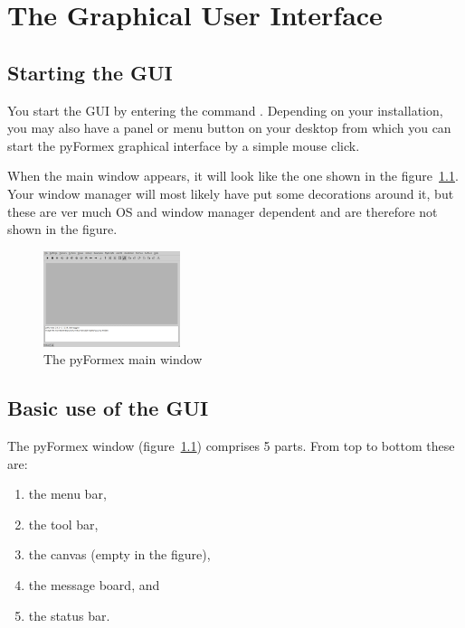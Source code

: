 
\chapter{The Graphical User Interface}
\label{cha:gui}

\section{Starting the GUI}
You start the \pyf GUI by entering the command . Depending on your installation, you may also have a panel or menu button on your desktop from which you can start the pyFormex graphical interface by a simple mouse click. 

When the main window appears, it will look like the one shown in the figure~\ref{fig:gui}. Your window manager will most likely have put some decorations around it, but these are ver much OS and window manager dependent and are therefore not shown in the figure.

\begin{figure}[h]
  \centering
  \begin{makeimage}
  \end{makeimage}
  \begin{latexonly}
    \includegraphics[width=4cm]{images/gui}
  \end{latexonly}
  \begin{htmlonly}
  \end{htmlonly}  
  \caption{The pyFormex main window}
  \label{fig:gui}
\end{figure}

\section{Basic use of the GUI}

The pyFormex window (figure~\ref{fig:gui}) comprises 5 parts. From top to bottom these are:
\begin{enumerate}
\item the menu bar,
\item the tool bar,
\item the canvas (empty in the figure),
\item the message board, and
\item the status bar.
\end{enumerate}




